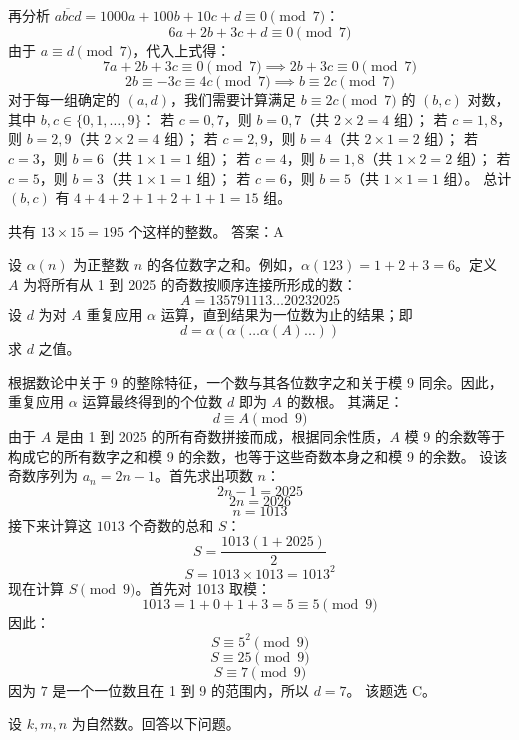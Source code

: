 \begin{questions}
\begin{solution}
再分析 $\overline{abcd} = 1000a + 100b + 10c + d \equiv 0 \pmod 7$：
\[ 6a + 2b + 3c + d \equiv 0 \pmod 7 \]
由于 $a \equiv d \pmod 7$，代入上式得：
\[ 7a + 2b + 3c \equiv 0 \pmod 7 \implies 2b + 3c \equiv 0 \pmod 7 \]
\[ 2b \equiv -3c \equiv 4c \pmod 7 \implies b \equiv 2c \pmod 7 \]
对于每一组确定的 $(a, d)$，我们需要计算满足 $b \equiv 2c \pmod 7$ 的 $(b, c)$ 对数，其中 $b, c \in \{0, 1, \dots, 9\}$：
 若 $c=0, 7$，则 $b=0, 7$（共 $2 \times 2 = 4$ 组）；
 若 $c=1, 8$，则 $b=2, 9$（共 $2 \times 2 = 4$ 组）；
 若 $c=2, 9$，则 $b=4$（共 $2 \times 1 = 2$ 组）；
 若 $c=3$，则 $b=6$（共 $1 \times 1 = 1$ 组）；
 若 $c=4$，则 $b=1, 8$（共 $1 \times 2 = 2$ 组）；
 若 $c=5$，则 $b=3$（共 $1 \times 1 = 1$ 组）；
 若 $c=6$，则 $b=5$（共 $1 \times 1 = 1$ 组）。
总计 $(b, c)$ 有 $4+4+2+1+2+1+1 = 15$ 组。

共有 $13 \times 15 = 195$ 个这样的整数。
答案：A
\end{solution}

\question 设 $\alpha(n)$ 为正整数 $n$ 的各位数字之和。例如，$\alpha(123) = 1 + 2 + 3 = 6$。定义 $A$ 为将所有从 1 到 2025 的奇数按顺序连接所形成的数：
\[
A = 135791113 \dots 20232025
\]
设 $d$ 为对 $A$ 重复应用 $\alpha$ 运算，直到结果为一位数为止的结果；即
\[
d = \alpha(\alpha(\dots\alpha(A)\dots))
\]
求 $d$ 之值。

\begin{solution}
根据数论中关于 9 的整除特征，一个数与其各位数字之和关于模 9 同余。因此，重复应用 $\alpha$ 运算最终得到的个位数 $d$ 即为 $A$ 的数根。
其满足：
\[
d \equiv A \pmod 9
\]
由于 $A$ 是由 1 到 2025 的所有奇数拼接而成，根据同余性质，$A$ 模 9 的余数等于构成它的所有数字之和模 9 的余数，也等于这些奇数本身之和模 9 的余数。
设该奇数序列为 $a_n = 2n - 1$。首先求出项数 $n$：
\[
2n - 1 = 2025
\]
\[
2n = 2026
\]
\[
n = 1013
\]
接下来计算这 $1013$ 个奇数的总和 $S$：
\[
S = \frac{1013(1 + 2025)}{2}
\]
\[
S = 1013 \times 1013 = 1013^2
\]
现在计算 $S \pmod 9$。首先对 1013 取模：
\[
1013 = 1 + 0 + 1 + 3 = 5 \equiv 5 \pmod 9
\]
因此：
\[
S \equiv 5^2 \pmod 9
\]
\[
S \equiv 25 \pmod 9
\]
\[
S \equiv 7 \pmod 9
\]
因为 $7$ 是一个一位数且在 1 到 9 的范围内，所以 $d = 7$。
该题选 C。
\end{solution}

\question
设 $k, m, n$ 为自然数。回答以下问题。

\begin{parts}

\end{parts}
\end{questions}
